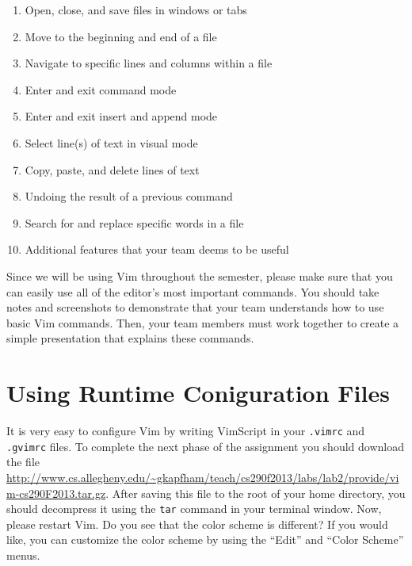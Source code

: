 \begin{enumerate}

	\item Open, close, and save files in windows or tabs

	\item Move to the beginning and end of a file

	\item Navigate to specific lines and columns within a file

	\item Enter and exit command mode

	\item Enter and exit insert and append mode

	\item Select line(s) of text in visual mode

	\item Copy, paste, and delete lines of text

	\item Undoing the result of a previous command

	\item Search for and replace specific words in a file 

	\item Additional features that your team deems to be useful

\end{enumerate}

Since we will be using Vim throughout the semester, please make sure that you can easily use all of the editor's most
important commands.  You should take notes and screenshots to demonstrate that your team understands how to use basic
Vim commands.  Then, your team members must work together to create a simple presentation that explains these commands. 

\section*{Using Runtime Coniguration Files}

It is very easy to configure Vim by writing VimScript in your {\tt .vimrc} and {\tt .gvimrc} files.  To complete the
next phase of the assignment you should download the file
\url{http://www.cs.allegheny.edu/~gkapfham/teach/cs290f2013/labs/lab2/provide/vim-cs290F2013.tar.gz}.  After saving this
file to the root of your home directory, you should decompress it using the {\tt tar} command in your terminal window.
Now, please restart Vim.  Do you see that the color scheme is different? If you would like, you can customize the color
scheme by using the ``Edit'' and ``Color Scheme'' menus. 

